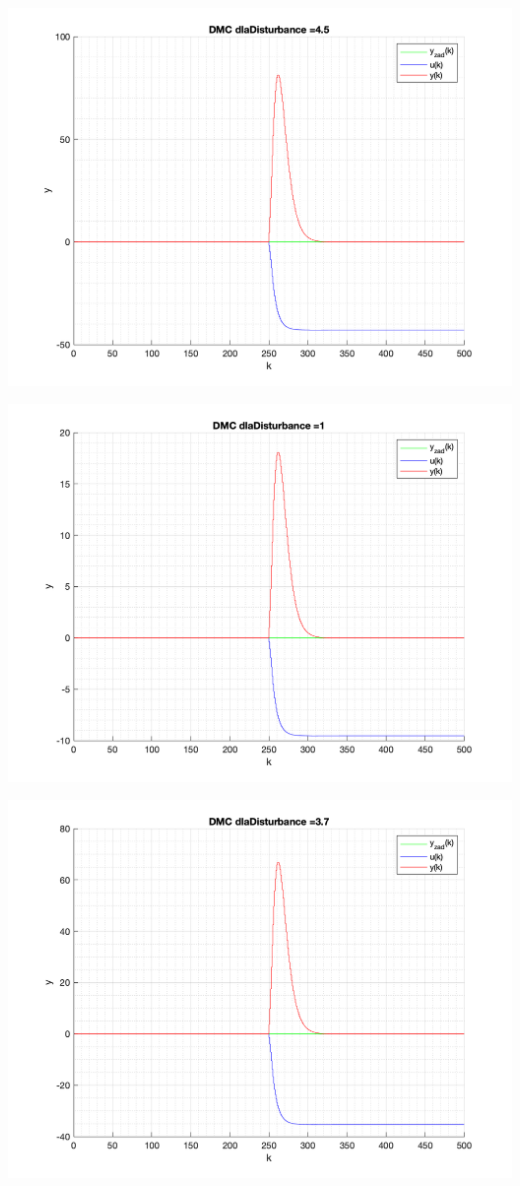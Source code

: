 \documentclass[a4paper, 11pt]{article}
\begin{document}
\begin{enumerate}
 \includegraphics[width=\linewidth]{./ModelsP4_Disturbance/P4_DMC_Disturbance_4_5_png.png} 
 
 \includegraphics[width=\linewidth]{./ModelsP4_Disturbance/P4_DMC_Disturbance_1_png.png} 
 
 \includegraphics[width=\linewidth]{./ModelsP4_Disturbance/P4_DMC_Disturbance_3_7_png.png} 
 

\end{enumerate}
\end{document}
